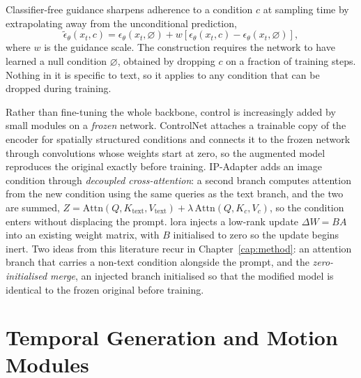 Classifier-free guidance \citep{ho2022cfg} sharpens adherence to a condition $c$ at sampling time
by extrapolating away from the unconditional prediction,
%
\begin{equation}\label{eq:cfg}
    \tilde{\epsilon}_\theta(x_t,c) = \epsilon_\theta(x_t,\varnothing)
    + w\left[\epsilon_\theta(x_t,c) - \epsilon_\theta(x_t,\varnothing)\right],
\end{equation}
%
where $w$ is the guidance scale. The construction requires the network to have learned a null
condition $\varnothing$, obtained by dropping $c$ on a fraction of training steps. Nothing in it is
specific to text, so it applies to any condition that can be dropped during training.

Rather than fine-tuning the whole backbone, control is increasingly added by small modules on a
\emph{frozen} network. ControlNet \citep{zhang2023controlnet} attaches a trainable copy of the
encoder for spatially structured conditions and connects it to the frozen network through
convolutions whose weights start at zero, so the augmented model reproduces the original exactly
before training. IP-Adapter \citep{ye2023ipadapter} adds an image condition through
\emph{decoupled cross-attention}: a second branch computes attention from the new condition using
the same queries as the text branch, and the two are summed,
$Z = \mathrm{Attn}(Q,K_\text{text},V_\text{text}) + \lambda\,\mathrm{Attn}(Q,K_c,V_c)$, so the
condition enters without displacing the prompt. \gls{lora} \citep{hu2022lora} injects a low-rank
update $\Delta W = BA$ into an existing weight matrix, with $B$ initialised to zero so the update
begins inert. Two ideas from this literature recur in Chapter~\ref{cap:method}: an attention branch
that carries a non-text condition alongside the prompt, and the \emph{zero-initialised merge}, an
injected branch initialised so that the modified model is identical to the frozen original before
training.

\section{Temporal Generation and Motion Modules}\label{sec:bg-temporal}


